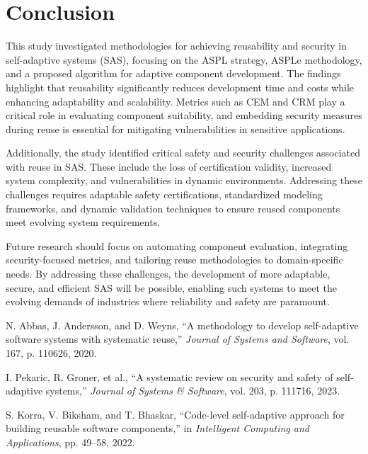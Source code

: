 \documentclass[a4paper,10pt]{article}
\begin{document}
\section{Conclusion}

This study investigated methodologies for achieving reusability and security in self-adaptive systems (SAS), focusing on the ASPL strategy, ASPLe methodology, and a proposed algorithm for adaptive component development. The findings highlight that reusability significantly reduces development time and costs while enhancing adaptability and scalability. Metrics such as CEM and CRM play a critical role in evaluating component suitability, and embedding security measures during reuse is essential for mitigating vulnerabilities in sensitive applications.

Additionally, the study identified critical safety and security challenges associated with reuse in SAS. These include the loss of certification validity, increased system complexity, and vulnerabilities in dynamic environments. Addressing these challenges requires adaptable safety certifications, standardized modeling frameworks, and dynamic validation techniques to ensure reused components meet evolving system requirements.

Future research should focus on automating component evaluation, integrating security-focused metrics, and tailoring reuse methodologies to domain-specific needs. By addressing these challenges, the development of more adaptable, secure, and efficient SAS will be possible, enabling such systems to meet the evolving demands of industries where reliability and safety are paramount.



\begin{thebibliography}{9}


N. Abbas, J. Andersson, and D. Weyns, ``A methodology to develop self-adaptive software systems with systematic reuse,'' \emph{Journal of Systems and Software}, vol. 167, p. 110626, 2020.

I. Pekaric, R. Groner, et al., ``A systematic review on security and safety of self-adaptive systems,'' \emph{Journal of Systems \& Software}, vol. 203, p. 111716, 2023.

S. Korra, V. Biksham, and T. Bhaskar, ``Code-level self-adaptive approach for building reusable software components,'' in \emph{Intelligent Computing and Applications}, pp. 49--58, 2022.
\end{thebibliography}
\end{document}
